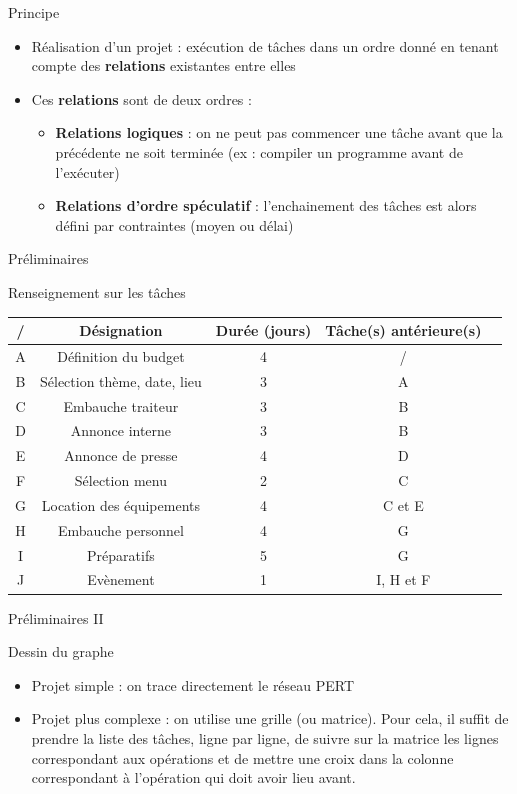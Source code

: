 \documentclass{beamer}
\begin{document}
\begin{frame}{Principe}
\begin{itemize}
    \item Réalisation d'un projet : exécution de tâches dans un ordre donné en tenant compte des \textbf{relations} existantes entre elles
    \item Ces \textbf{relations} sont de deux ordres : 
    \begin{itemize}
        \item \textbf{Relations logiques} : on ne peut pas commencer une tâche avant que la précédente ne soit terminée (ex : compiler un programme avant de l'exécuter)
        \item \textbf{Relations d'ordre spéculatif} : l'enchainement des tâches est alors défini par contraintes (moyen ou délai)
    \end{itemize}
    
\end{itemize}
\end{frame}

\begin{frame}{Préliminaires}
\begin{block}{Renseignement sur les tâches}
\begin{tabular}{|c|c|c|c|c|}
\hline
    / & Désignation & Durée (jours) & Tâche(s) antérieure(s) \\
    \hline
    A & Définition du budget & 4 & / \\
    \hline
    B & Sélection thème, date, lieu & 3 & A \\
    \hline
    C & Embauche traiteur & 3 & B \\
    \hline
    D & Annonce interne & 3 & B \\
    \hline
    E & Annonce de presse & 4 & D \\
    \hline
    F & Sélection menu & 2 & C \\
    \hline
    G & Location des équipements & 4 & C et E \\
    \hline
    H & Embauche personnel & 4 & G \\
    \hline
    I & Préparatifs & 5 & G \\
    \hline
    J & Evènement & 1 & I, H et F \\
    \hline
\end{tabular}
\end{block}
\end{frame}

\begin{frame}{Préliminaires II}
\begin{block}{Dessin du graphe}
\begin{itemize}
    \item Projet simple : on trace directement le réseau PERT
    \item Projet plus complexe : on utilise une grille (ou matrice). Pour cela, il suffit de prendre la liste des tâches, ligne par ligne, de suivre sur la matrice les lignes correspondant aux opérations et de mettre une croix dans la colonne correspondant à l’opération qui doit avoir lieu avant.
\end{itemize}
\end{block}
\end{frame}
\end{document}
